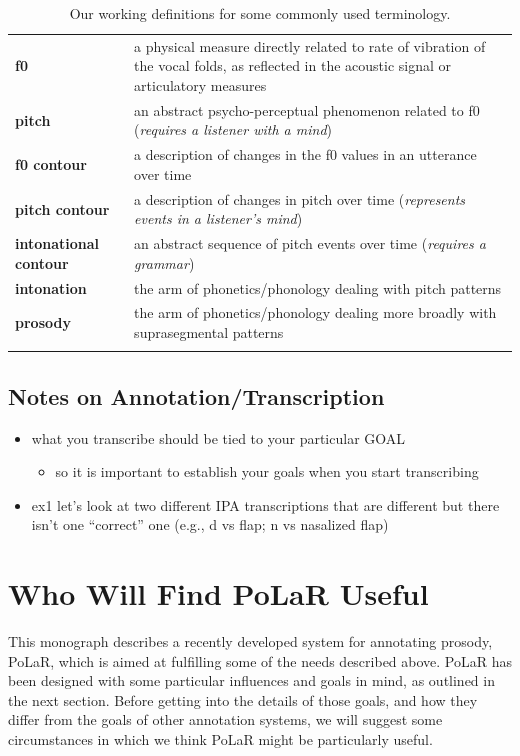 \documentclass[11pt, twoside]{memoir}
\begin{document}
\begin{longtable}{>{\bfseries}p{.175\linewidth}p{.75\linewidth}} \endhead\toprule 
f0 &
a physical measure directly related to rate of vibration of the vocal folds, as reflected in the acoustic signal or articulatory measures
\tabularnewline\hdashline
pitch &
an abstract psycho-perceptual phenomenon related to f0 (\textit{requires a listener with a mind})
\tabularnewline\hdashline
f0 contour &
a description of changes in the f0 values in an utterance over time
\tabularnewline\hdashline
pitch contour &
a description of changes in pitch over time (\textit{represents events in a listener’s mind})
\tabularnewline\hdashline
intonational contour &
an abstract sequence of pitch events over time (\textit{requires a grammar})
\tabularnewline\hdashline
intonation &
the arm of phonetics\slash phonology dealing with pitch patterns
\tabularnewline\hdashline
prosody &
the arm of phonetics\slash phonology dealing more broadly with suprasegmental patterns
\tabularnewline\bottomrule 
\caption{Our working definitions for some commonly used terminology.
\label{tab:terminology}
}
\end{longtable}



\subsection{Notes on Annotation/Transcription}
\begingroup\color{red}
\begin{itemize}
\item 	what you transcribe should be tied to your particular GOAL
\begin{itemize}
\item so it is important to establish your goals when you start transcribing
\end{itemize}
\item ex1 let’s look at two different IPA transcriptions that are different but there isn’t one “correct” one (e.g., d vs flap; n vs nasalized flap)
\end{itemize}
\endgroup


\section{Who Will Find PoLaR Useful}\label{sec:who-will-find-polar-useful}

This monograph describes a recently developed system for annotating prosody, PoLaR, which is  aimed at fulfilling some of the needs described above. PoLaR has been designed with some particular influences and goals in mind, as outlined in the next section. Before getting into the details of those goals, and how they differ from the goals of other annotation systems, we will suggest some circumstances in which we think PoLaR might be particularly useful.
\end{document}
